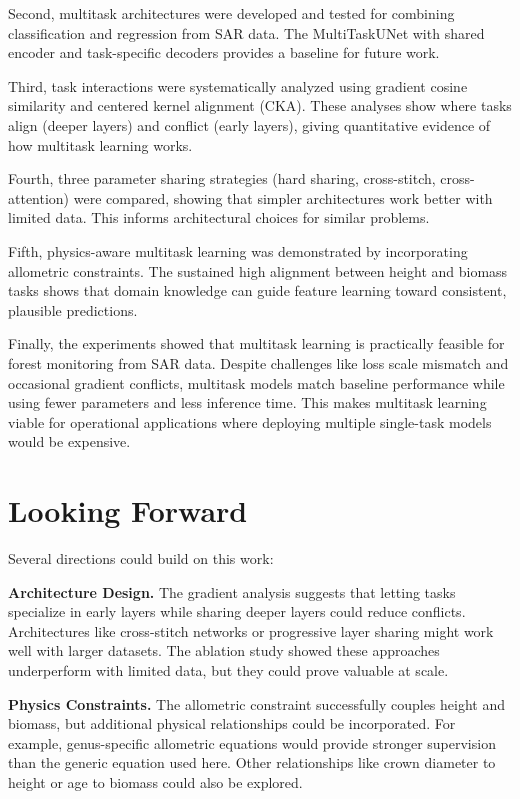 Second, multitask architectures were developed and tested for combining classification and regression from SAR data. The MultiTaskUNet with shared encoder and task-specific decoders provides a baseline for future work.

Third, task interactions were systematically analyzed using gradient cosine similarity and centered kernel alignment (CKA). These analyses show where tasks align (deeper layers) and conflict (early layers), giving quantitative evidence of how multitask learning works.

Fourth, three parameter sharing strategies (hard sharing, cross-stitch, cross-attention) were compared, showing that simpler architectures work better with limited data. This informs architectural choices for similar problems.

Fifth, physics-aware multitask learning was demonstrated by incorporating allometric constraints. The sustained high alignment between height and biomass tasks shows that domain knowledge can guide feature learning toward consistent, plausible predictions.

Finally, the experiments showed that multitask learning is practically feasible for forest monitoring from SAR data. Despite challenges like loss scale mismatch and occasional gradient conflicts, multitask models match baseline performance while using fewer parameters and less inference time. This makes multitask learning viable for operational applications where deploying multiple single-task models would be expensive.

\section{Looking Forward}

Several directions could build on this work:

\textbf{Architecture Design.} The gradient analysis suggests that letting tasks specialize in early layers while sharing deeper layers could reduce conflicts. Architectures like cross-stitch networks or progressive layer sharing might work well with larger datasets. The ablation study showed these approaches underperform with limited data, but they could prove valuable at scale.

\textbf{Physics Constraints.} The allometric constraint successfully couples height and biomass, but additional physical relationships could be incorporated. For example, genus-specific allometric equations would provide stronger supervision than the generic equation used here. Other relationships like crown diameter to height or age to biomass could also be explored.

